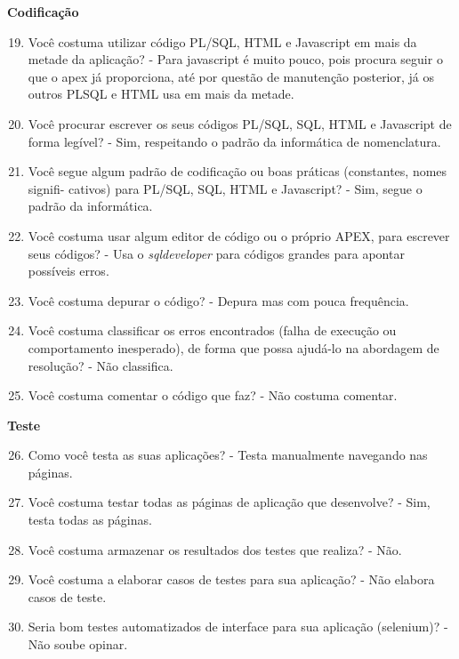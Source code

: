 \begin{anexosenv}
\textbf{Codificação}

\begin{enumerate}
\setcounter{enumi}{18}
\item Você costuma utilizar código PL/SQL, HTML e Javascript em mais da metade da
aplicação?\newline
- Para javascript é muito pouco, pois procura seguir o que o apex já proporciona, até por questão de manutenção posterior, já os outros PLSQL e HTML usa em mais da metade.
\item Você procurar escrever os seus códigos PL/SQL, SQL, HTML e Javascript de forma
legível?\newline
- Sim, respeitando o padrão da informática de nomenclatura.
\item Você segue algum padrão de codificação ou boas práticas (constantes, nomes signifi-
cativos) para PL/SQL, SQL, HTML e Javascript?\newline
- Sim, segue o padrão da informática.
\item Você costuma usar algum editor de código ou o próprio APEX, para escrever seus
códigos?\newline
- Usa o \textit{sqldeveloper} para códigos grandes para apontar possíveis erros.
\item Você costuma depurar o código?\newline
- Depura mas com pouca frequência.
\item Você costuma classificar os erros encontrados (falha de execução ou comportamento
inesperado), de forma que possa ajudá-lo na abordagem de resolução?\newline
- Não classifica.
\item Você costuma comentar o código que faz?\newline
- Não costuma comentar.
\end{enumerate}

\textbf{Teste}

\begin{enumerate}
\setcounter{enumi}{25}
\item Como você testa as suas aplicações?\newline
- Testa manualmente navegando nas páginas.
\item Você costuma testar todas as páginas de aplicação que desenvolve?\newline
- Sim, testa todas as páginas.
\item Você costuma armazenar os resultados dos testes que realiza?\newline
- Não.
\item Você costuma a elaborar casos de testes para sua aplicação?\newline
- Não elabora casos de teste.
\item Seria bom testes automatizados de interface para sua aplicação (selenium)?\newline
- Não soube opinar.
\end{enumerate}


\end{anexosenv}
